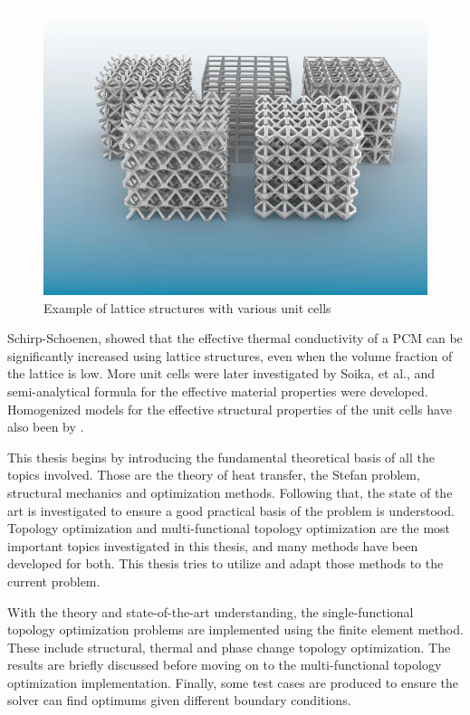 \pagebreak
\begin{figure}[ht]
    \centering
    \includegraphics[width=0.7\linewidth]{figures/chapter_1/LatticeStructures.png}
    \caption{Example of lattice structures with various unit cells \cite{Gen3DAdmin_2021}}
\end{figure}

Schirp-Schoenen, \cite{Schirp_2020} showed that the effective thermal conductivity of a PCM can be significantly increased using lattice structures, even when the volume fraction of the lattice is low. More unit cells were later investigated by Soika, et al., \cite{Piacquadio_Soika_Schirp_Schröder_Filippeschi_2023} and semi-analytical formula for the effective material properties were developed. Homogenized models for the effective structural properties of the unit cells have also been by \cite{Bühring_Soika_Schirp-Schoenen_Schröder_2022}. 

This thesis begins by introducing the fundamental theoretical basis of all the topics involved. Those are the theory of heat transfer, the Stefan problem, structural mechanics and optimization methods. Following that, the state of the art is investigated to ensure a good practical basis of the problem is understood. Topology optimization and multi-functional topology optimization are the most important topics investigated in this thesis, and many methods have been developed for both. This thesis tries to utilize and adapt those methods to the current problem.

With the theory and state-of-the-art understanding, the single-functional topology optimization problems are implemented using the finite element method. These include structural, thermal and phase change topology optimization. The results are briefly discussed before moving on to the multi-functional topology optimization implementation. Finally, some test cases are produced to ensure the solver can find optimums given different boundary conditions.